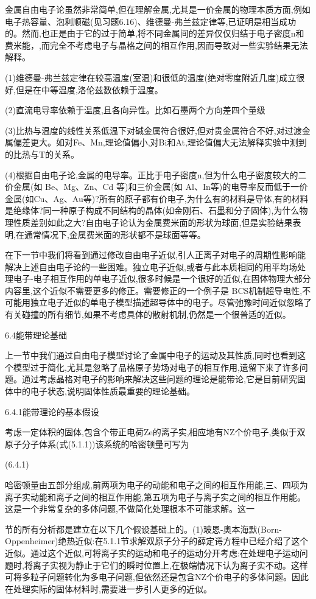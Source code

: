 金属自由电子论虽然非常简单,但在理解金属,尤其是一价金属的物理本质方面,例如电子热容量、泡利顺磁(见习题6.16)、维德曼-弗兰兹定律等,已证明是相当成功的。然而,也正是由于它的过于简单,将不同金属间的差异仅仅归结于电子密度n和费米能，,而完全不考虑电子与晶格之间的相互作用,因而导致对一些实验结果无法解释。

(1)维德曼-弗兰兹定律在较高温度(室温)和很低的温度(绝对零度附近几度)成立很好,但是在中等温度,洛伦兹数依赖于温度。

(2)直流电导率依赖于温度,且各向异性。比如石墨两个方向差四个量级

(3)比热与温度的线性关系低温下对碱金属符合很好,但对贵金属符合不好,对过渡金属偏差更大。如对Fe、Mn,理论值偏小,对Bi和At,理论值偏大无法解释实验中测到的比热与T的关系。

(4)根据自由电子论,金属的电导率。正比于电子密度n,但为什么电子密度较大的二价金属(如 Be、Mg、Zn、Cd 等)和三价金属(如 Al、In等)的电导率反而低于一价金属(如Cu、Ag、Au等)?所有的原子都有价电子,为什么有的材料是导体,有的材料是绝缘体?同一种原子构成不同结构的晶体(如金刚石、石墨和分子固体),为什么物理性质差别如此之大?自由电子论认为金属费米面的形状为球面,但是实验结果表明,在通常情况下,金属费米面的形状都不是球面等等。

在下一节中我们将看到通过修改自由电子近似,引人正离子对电子的周期性影响能解决上述自由电子论的一些困难。独立电子近似,或者与此本质相同的用平均场处理电子-电子相互作用的单电子近似,很多时候是一个很好的近似,在固体物理大部分内容里,这个近似不需要更多的修正。需要修正的一个例子是 BCS机制超导电性,不可能用独立电子近似的单电子模型描述超导体中的电子。尽管弛豫时间近似忽略了有关碰撞的所有细节,如果不考虑具体的散射机制,仍然是一个很普适的近似。

6.4能带理论基础

上一节中我们通过自由电子模型讨论了金属中电子的运动及其性质,同时也看到这个模型过于简化,尤其是忽略了品格原子势场对电子的相互作用,遗留下来了许多问题。通过考虑晶格对电子的影响来解决这些问题的理论是能带论,它是目前研究固体中的电子状态,说明固体性质最重要的理论基础。

6.4.1能带理论的基本假设

考虑一定体积的固体,包含个带正电荷Ze的离子实,相应地有NZ个价电子,类似于双原子分子体系(式(5.1.1))该系统的哈密顿量可写为

 	(6.4.1)

哈密顿量由五部分组成,前两项为电子的动能和电子之间的相互作用能,三、四项为离子实动能和离子之间的相互作用能,第五项为电子与离子实之间的相互作用能。这是一个非常复杂的多体问题,不做简化处理根本不可能求解。这一

节的所有分析都是建立在以下几个假设基础上的。(1)玻恩-奥本海默(Born-Oppenheimer)绝热近似:在5.1.1节求解双原子分子的薛定谔方程中已经介绍了这个近似。通过这个近似,可将离子实的运动和电子的运动分开考虑:在处理电子运动问题时,将离子实视为静止于它们的瞬时位置上,在极端情况下认为离子实不动。这样可将多粒子问题转化为多电子问题,但依然还是包含NZ个价电子的多体问题。因此在处理实际的固体材料时,需要进一步引人更多的近似。

